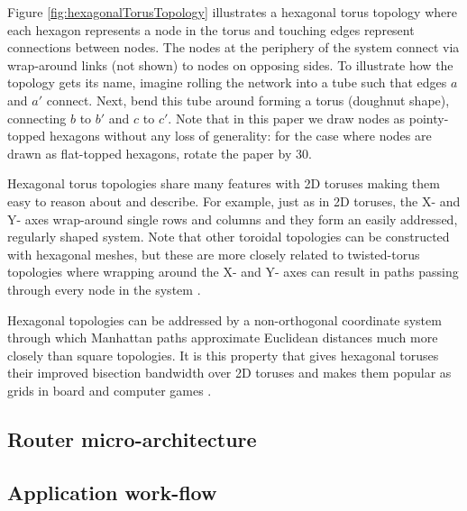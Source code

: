 			Figure \ref{fig:hexagonalTorusTopology} illustrates a hexagonal torus
			topology where each hexagon represents a node in the torus and touching
			edges represent connections between nodes. The nodes at the periphery of
			the system connect via wrap-around links (not shown) to nodes on opposing
			sides. To illustrate how the topology gets its name, imagine rolling the
			network into a tube such that edges $a$ and $a'$ connect. Next, bend this
			tube around forming a torus (doughnut shape), connecting $b$ to $b'$ and
			$c$ to $c'$. Note that in this paper we draw nodes as pointy-topped
			hexagons without any loss of generality: for the case where nodes are
			drawn as flat-topped hexagons, rotate the paper by 30\degree{}.
			
			Hexagonal torus topologies share many features with 2D toruses making them
			easy to reason about and describe. For example, just as in 2D toruses, the
			X- and Y- axes wrap-around single rows and columns and they form an easily
			addressed, regularly shaped system. Note that other toroidal topologies
			can be constructed with hexagonal meshes, but these are more closely
			related to twisted-torus topologies where wrapping around the X- and Y-
			axes can result in paths passing through every node in the system
			\cite{camara10}.
			
			Hexagonal topologies can be addressed by a non-orthogonal coordinate
			system through which Manhattan paths approximate Euclidean distances much
			more closely than square topologies. It is this property that gives
			hexagonal toruses their improved bisection bandwidth over 2D toruses and
			makes them popular as grids in board and computer games \cite{patel15}.
		
		\subsection{Router micro-architecture}
		\subsection{Application work-flow}
